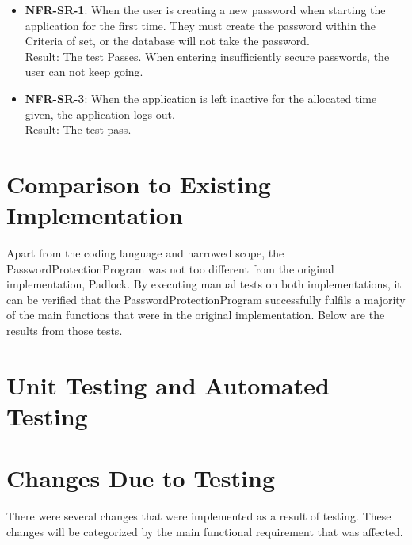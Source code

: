 \documentclass[12pt, titlepage]{article}
\begin{document}
		\begin{itemize}
			
			\item \textbf{NFR-SR-1}: When the user is creating a new password when starting the application for the first time. They must create the password within the Criteria of set, or the database will not take the password.\\
			Result: The test Passes. When entering insufficiently secure passwords, the user can not keep going.

			\item \textbf{NFR-SR-3}: When the application is left inactive for the allocated time given, the application logs out.\\
			Result: The test pass.

		\end{itemize}
	
\section{Comparison to Existing Implementation}	

Apart from the coding language and narrowed scope, the PasswordProtectionProgram was not too different from the original implementation, Padlock. By executing manual tests on both implementations, it can be verified that the PasswordProtectionProgram successfully fulfils a majority of the main functions that were in the original implementation. Below are the results from those tests.

\section{Unit Testing and Automated Testing}

\section{Changes Due to Testing}
	
	There were several changes that were implemented as a result of testing. These changes will be categorized by the main functional requirement that was affected.
	
\end{document}
